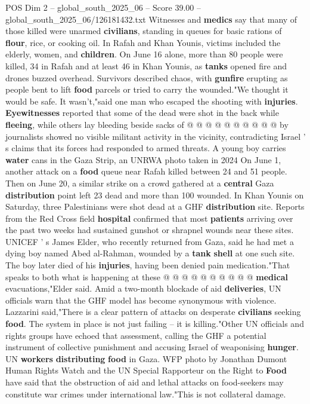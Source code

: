 \begin{textsample}{POS Dim 2 – global\_south\_2025\_06 – Score 39.00 – global\_south\_2025\_06/126181432.txt}
Witnesses and \textbf{medics} say that many of those killed were unarmed \textbf{civilians}, standing in queues for basic rations of \textbf{flour}, rice, or cooking oil.
In Rafah and Khan Younis, victims included the elderly, women, and \textbf{children}.
On June 16 alone, more than 80 people were killed, 34 in Rafah and at least 46 in Khan Younis, as \textbf{tanks} opened fire and drones buzzed overhead.
Survivors described chaos, with \textbf{gunfire} erupting as people bent to lift \textbf{food} parcels or tried to carry the wounded."We thought it would be safe.
It wasn't,"said one man who escaped the shooting with \textbf{injuries}. \textbf{Eyewitnesses} reported that some of the dead were shot in the back while \textbf{fleeing}, while others lay bleeding beside sacks of @ @ @ @ @ @ @ @ @ @ by journalists showed no visible militant activity in the vicinity, contradicting Israel ' s claims that its forces had responded to armed threats.
A young boy carries \textbf{water} cans in the Gaza Strip, an UNRWA photo taken in 2024 On June 1, another attack on a \textbf{food} queue near Rafah killed between 24 and 51 people.
Then on June 20, a similar strike on a crowd gathered at a \textbf{central} Gaza \textbf{distribution} point left 23 dead and more than 100 wounded.
In Khan Younis on Saturday, three Palestinians were shot dead at a GHF \textbf{distribution} site.
Reports from the Red Cross field \textbf{hospital} confirmed that most \textbf{patients} arriving over the past two weeks had sustained gunshot or shrapnel wounds near these sites.
UNICEF ' s James Elder, who recently returned from Gaza, said he had met a dying boy named Abed al-Rahman, wounded by a \textbf{tank} \textbf{shell} at one such site.
The boy later died of his \textbf{injuries}, having been denied pain medication."That speaks to both what is happening at these @ @ @ @ @ @ @ @ @ @ \textbf{medical} evacuations,"Elder said.
Amid a two-month blockade of aid \textbf{deliveries}, UN officials warn that the GHF model has become synonymous with violence.
Lazzarini said,"There is a clear pattern of attacks on desperate \textbf{civilians} seeking \textbf{food}.
The system in place is not just failing -- it is killing."Other UN officials and rights groups have echoed that assessment, calling the GHF a potential instrument of collective punishment and accusing Israel of weaponising \textbf{hunger}.
UN \textbf{workers} \textbf{distributing} \textbf{food} in Gaza.
WFP photo by Jonathan Dumont Human Rights Watch and the UN Special Rapporteur on the Right to \textbf{Food} have said that the obstruction of aid and lethal attacks on food-seekers may constitute war crimes under international law."This is not collateral damage.

\end{textsample}
